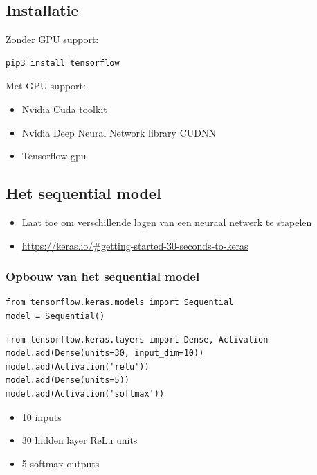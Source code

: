\documentclass{article}
\begin{document}
\subsection{Installatie}

Zonder GPU support:

\begin{verbatim}
pip3 install tensorflow
\end{verbatim}

Met GPU support:

\begin{itemize}
    \item Nvidia Cuda toolkit
    \item Nvidia Deep Neural Network library CUDNN
    \item Tensorflow-gpu
\end{itemize}

\subsection{Het sequential model}

\begin{itemize}
    \item Laat toe om verschillende lagen van een neuraal netwerk te stapelen
    \item \url{https://keras.io/#getting-started-30-seconds-to-keras}
\end{itemize}

\subsubsection{Opbouw van het sequential model}


\begin{verbatim}
from tensorflow.keras.models import Sequential
model = Sequential()
\end{verbatim}

\begin{verbatim}
from tensorflow.keras.layers import Dense, Activation
model.add(Dense(units=30, input_dim=10))
model.add(Activation('relu'))
model.add(Dense(units=5))
model.add(Activation('softmax'))
\end{verbatim}

\begin{itemize}
    \item 10 inputs
    \item 30 hidden layer ReLu units
    \item 5 softmax outputs
\end{itemize}
\end{document}
